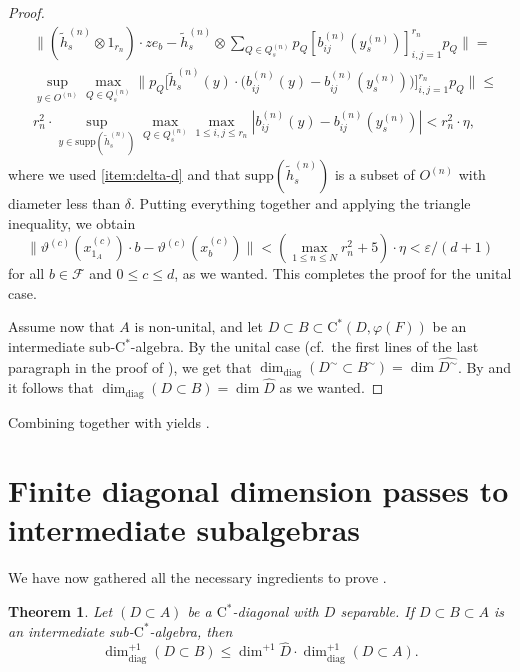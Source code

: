 \documentclass[11pt,a4paper]{amsart}
\newtheorem{theorem}{Theorem}[section]
\theoremstyle{definition}
\numberwithin{equation}{section}
\newcommand{\mc}[1]{\mathcal{#1}}
\def\supp{\mathrm{supp}}
\begin{document}
\begin{proof}
\begin{align}\label{eq:step6}
&\bigg\|(\tilde{h}_s^{(n)}\otimes 1_{r_n})\cdot ze_b - \tilde{h}_s^{(n)}\otimes\sum_{Q\in Q_s^{(n)}} p_Q[b_{ij}^{(n)}(y_s^{(n)})]_{i,j=1}^{r_n}p_Q\bigg\|=\\
&\sup_{y\in O^{(n)}}\max_{Q\in Q_s^{(n)}}\big\|p_Q\big[\tilde{h}_s^{(n)}(y)\cdot \big(b_{ij}^{(n)}(y)-b_{ij}^{(n)}(y_s^{(n)})\big)\big]_{i,j=1}^{r_n}p_Q\big\|\le \nonumber\\
&r_n^2\cdot \sup_{y\in \supp(\tilde{h}_s^{(n)})}\max_{Q\in Q_s^{(n)}}\max_{1\le i,j\le r_n}|b_{ij}^{(n)}(y)-b_{ij}^{(n)}(y_s^{(n)})|<r_n^2\cdot \eta,\nonumber
\end{align}
where we used \ref{item:delta-d} and that $\supp(\tilde{h}_s^{(n)})$ is a subset of $O^{(n)}$ with diameter less than $\delta$. Putting everything together and applying the triangle inequality, we obtain
\begin{equation}\label{eq:final}
\|\vartheta^{(c)}(x_{1_A}^{(c)})\cdot b-\vartheta^{(c)}(x_b^{(c)})\|<(\max_{1\le n\le N}r_n^2+5)\cdot \eta<\varepsilon/(d+1)
\end{equation}
for all $b\in\mc{F}$ and $0\le c\le d$, as we wanted. This completes the proof for the unital case. 



Assume now that $A$ is non-unital, and let $D\subset B\subset \mathrm{C}^\ast(D,\varphi(F))$ be an intermediate sub-$\mathrm{C}^\ast$-algebra. By the unital case (cf.\ the first lines of the last paragraph in the proof of ), we get that $\dim_\mathrm{diag}(D^\sim\subset B^\sim)=\dim\widehat{D^\sim}$. By \cite[Theorem~3.1~(iv)]{LiLiaWin23} and \cite[Remark~2.11]{WinZac10} it follows that $\dim_\mathrm{diag}(D\subset B)=\dim\widehat{D}$ as we wanted.
\end{proof}

Combining  together with  yields .
\section{Finite diagonal dimension passes to intermediate subalgebras}

\noindent We have now gathered all the necessary ingredients to prove .

\begin{theorem}\label{thm:main}
Let $(D\subset A)$ be a $\mathrm{C}^\ast$-diagonal with $D$ separable. If $D\subset B\subset A$ is an intermediate sub-$\mathrm{C}^\ast$-algebra, then
\begin{equation}\label{eq:main}
\dim_{\mathrm{diag}}^{+1}(D\subset B)\le \dim^{+1}\widehat{D}\cdot\dim^{+1}_\mathrm{diag}(D\subset A).
\end{equation}
\end{theorem}
\end{document}
